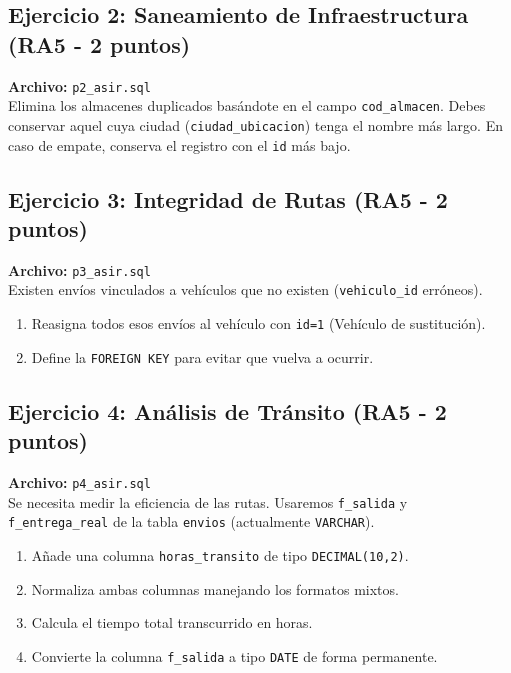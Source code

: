 \documentclass[12pt,a4paper]{article}
\begin{document}
\subsection{Ejercicio 2: Saneamiento de Infraestructura \textcolor{RA5}{(RA5 - 2 puntos)}}
\textbf{Archivo:} \texttt{p2\_asir.sql} \\
Elimina los almacenes duplicados basándote en el campo \texttt{cod\_almacen}. Debes conservar aquel cuya ciudad (\texttt{ciudad\_ubicacion}) tenga el nombre más largo. En caso de empate, conserva el registro con el \texttt{id} más bajo.


\subsection{Ejercicio 3: Integridad de Rutas \textcolor{RA5}{(RA5 - 2 puntos)}}
\textbf{Archivo:} \texttt{p3\_asir.sql} \\
Existen envíos vinculados a vehículos que no existen (\texttt{vehiculo\_id} erróneos).
\begin{enumerate}
    \item Reasigna todos esos envíos al vehículo con \texttt{id=1} (Vehículo de sustitución).
    \item Define la \texttt{FOREIGN KEY} para evitar que vuelva a ocurrir.
\end{enumerate}

\subsection{Ejercicio 4: Análisis de Tránsito \textcolor{RA5}{(RA5 - 2 puntos)}}
\textbf{Archivo:} \texttt{p4\_asir.sql} \\
Se necesita medir la eficiencia de las rutas. Usaremos \texttt{f\_salida} y \texttt{f\_entrega\_real} de la tabla \texttt{envios} (actualmente \texttt{VARCHAR}).
\begin{enumerate}
    \item Añade una columna \texttt{horas\_transito} de tipo \texttt{DECIMAL(10,2)}.
    \item Normaliza ambas columnas manejando los formatos mixtos.
    \item Calcula el tiempo total transcurrido en horas.
    \item Convierte la columna \texttt{f\_salida} a tipo \texttt{DATE} de forma permanente.
\end{enumerate}
\end{document}
